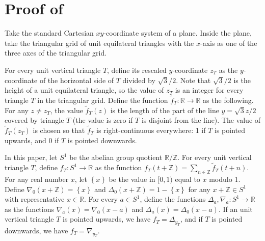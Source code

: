 \documentclass[a4paper]{amsart}
\theoremstyle{plain}
\theoremstyle{definition}
\begin{document}
\section{Proof of }

Take the standard Cartesian \(xy\)-coordinate system of a plane.
Inside the plane, take the triangular grid of unit equilateral triangles with the \(x\)-axis as one of the three axes of the triangular grid.

For every unit vertical triangle \(T\), define its rescaled \(y\)-coordinate \(z_T\) as the \(y\)-coordinate of the horizontal side of $T$ divided by \(\sqrt{3}/2\). Note that \(\sqrt{3}/2\) is the height of a unit equilateral triangle, so the value of \(z_T\) is an integer for every triangle \(T\) in the triangular grid.
Define the function \(\tilde{f}_T : \mathbb{R} \to \mathbb{R}\) as the following. For any \(z \neq z_T\), the value \(\tilde{f}_T(z)\) is the length of the part of the line \(y = \sqrt{3}z / 2\) covered by triangle \(T\) (the value is zero if \(T\) is disjoint from the line). The value of \(\tilde{f}_T(z_T)\) is chosen so that \(\tilde{f}_T\) is right-continuous everywhere: 1 if \(T\) is pointed upwards, and 0 if \(T\) is pointed downwards.

In this paper, let \(S^1\) be the abelian group quotient \(\mathbb{R} /\mathbb{Z}\). For every unit vertical triangle \(T\), define \(f_T : S^1 \to \mathbb{R}\) as the function \(f_T(t + \mathbb{Z}) = \sum_{n \in \mathbb{Z}} \tilde{f}_T(t + n)\).
For any real number \(x\), let \(\left\{ x \right\}\) be the value in \([0, 1)\) equal to \(x\) modulo 1.
Define \(\nabla_0 (x + \mathbb{Z}) = \left\{ x \right\}\) 
and \(\Delta_0 (x + \mathbb{Z}) = 1 - \left\{ x \right\}\) for any \(x + \mathbb{Z} \in S^1\) with representative $x \in \mathbb{R}$.
For every \(a \in S^1\), define the functions \(\Delta_a , \nabla_a : S^1 \to \mathbb{R}\) as the functions \(\nabla_a(x) = \nabla_0(x-a)\) and \(\Delta_a(x) = \Delta_0(x-a)\). If an unit vertical triangle \(T\) is pointed upwards, we have \(f_T = \Delta_{y_T}\), and if \(T\) is pointed downwards, we have \(f_T = \nabla_{y_T}\). 
\end{document}
